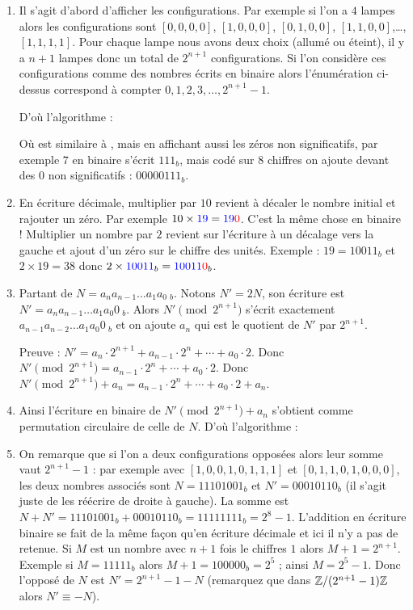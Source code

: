 \documentclass[class=report,crop=false]{standalone}
\begin{document}
\begin{enumerate}
  \item Il s'agit d'abord d'afficher les configurations. Par exemple si l'on a $4$ lampes alors
les configurations sont $[0,0,0,0]$, $[1,0,0,0]$, $[0,1,0,0]$, $[1,1,0,0]$,\ldots, $[1,1,1,1]$.
Pour chaque lampe nous avons deux choix (allumé ou éteint), il y a $n+1$ lampes donc un total
de $2^{n+1}$ configurations. Si l'on considère ces configurations comme des nombres écrits en binaire alors
l'énumération ci-dessus correspond à compter $0,1,2,3,\ldots, 2^{n+1}-1$.

D'où l'algorithme :

Où  est similaire à ,
mais en affichant aussi les zéros non significatifs, par exemple $7$ en binaire s'écrit $111_b$,
mais codé sur $8$ chiffres on ajoute devant des $0$ non significatifs : $00000111_b$.

  \item En écriture décimale, multiplier par $10$ revient à décaler le nombre initial et rajouter un zéro.
Par exemple $10\times{\color{blue}19} = {\color{blue}19}{\color{red}0}$.
C'est la même chose en binaire !
Multiplier un nombre par $2$ revient sur l'écriture à un décalage
vers la gauche et ajout d'un zéro sur le chiffre des unités.
Exemple : $19 = 10011_b$ et $2 \times 19 = 38$ donc $2 \times{\color{blue}10011}_b  = {\color{blue}10011}{\color{red}0}_b$.


  \item Partant de $N=a_n  a_{n-1}\ldots a_1 a_0 \ _b$. Notons $N'=2N$, son écriture est
$N' = a_n  a_{n-1}\ldots a_1 a_0 0 \ _b$.
Alors $N' \pmod {2^{n+1}}$ s'écrit exactement $a_{n-1} a_{n-2} \ldots a_1 a_0 0 \ _b$ et on ajoute $a_n$
qui est le quotient de $N'$ par $2^{n+1}$.

Preuve : $N' = a_n \cdot 2^{n+1} + a_{n-1} \cdot 2^n+\cdots +a_0 \cdot 2$. Donc $N' \pmod{2^{n+1}}
= a_{n-1} \cdot 2^n+\cdots + a_0 \cdot 2$. Donc $N'\pmod{2^{n+1}}+a_n = a_{n-1} \cdot 2^n+\cdots + a_0 \cdot 2 +a_n$.

  \item Ainsi l'écriture en binaire de $N' \pmod{2^{n+1}} + a_n$ s'obtient comme permutation circulaire de celle de $N$.
D'où l'algorithme :


  \item On remarque que si l'on a deux configurations opposées alors leur somme vaut $2^{n+1}-1$ :
par exemple avec $[1,0,0,1,0,1,1,1]$ et $[0,1,1,0,1,0,0,0]$, les deux nombres associés sont
$N = 11101001_b$ et $N' = 00010110_b$ (il s'agit juste de les réécrire de droite à gauche).
La somme est $N + N' = 11101001_b + 00010110_b = 11111111_b = 2^{8}-1$.
L'addition en écriture binaire se fait de la même façon qu'en écriture décimale et
ici il n'y a pas de retenue.
Si $M$ est un nombre avec $n+1$ fois le chiffres $1$ alors $M+1 = 2^{n+1}$.
Exemple si $M = 11111_b$ alors $M+1 = 100000_b = 2^5$ ; ainsi $M = 2^5-1$.
Donc l'opposé de $N$ est $N' = 2^{n+1}-1 - N$ (remarquez que dans $\mathbb{Z}/ (2^{n+1}-1) \mathbb{Z}$ alors $N' \equiv -N$).


\end{enumerate}
\end{document}
